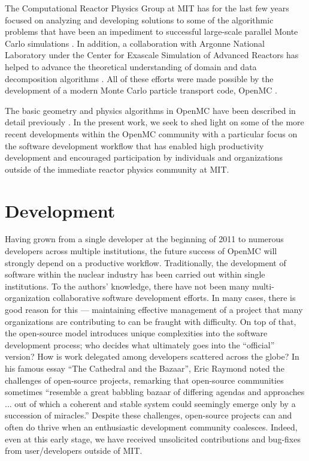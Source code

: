 \documentclass{ansconf}
\begin{document}
The Computational Reactor Physics Group at MIT has for the last few years
focused on analyzing and developing solutions to some of the algorithmic
problems that have been an impediment to successful large-scale parallel Monte
Carlo simulations \cite{pnst-romano-2011, nse-romano-2012,
  trans-romano-2012}. In addition, a collaboration with Argonne National
Laboratory under the Center for Exascale Simulation of Advanced Reactors has
helped to advance the theoretical understanding of domain and data decomposition
algorithms \cite{jcp-siegel-2012-1, jcp-siegel-2012-2}. All of these efforts
were made possible by the development of a modern Monte Carlo particle transport
code, OpenMC \cite{openmc-github-2012}.

The basic geometry and physics algorithms in OpenMC have been described in
detail previously \cite{ane-romano-2013}. In the present work, we seek to shed
light on some of the more recent developments within the OpenMC community with a
particular focus on the software development workflow that has enabled high
productivity development and encouraged participation by individuals and
organizations outside of the immediate reactor physics community at MIT.

\section{Development}

Having grown from a single developer at the beginning of 2011 to numerous
developers across multiple institutions, the future success of OpenMC will
strongly depend on a productive workflow. Traditionally, the development of
software within the nuclear industry has been carried out within single
institutions. To the authors' knowledge, there have not been many
multi-organization collaborative software development efforts. In many cases,
there is good reason for this --- maintaining effective management of a project
that many organizations are contributing to can be fraught with difficulty. On
top of that, the open-source model introduces unique complexities into the
software development process; who decides what ultimately goes into the
``official'' version? How is work delegated among developers scattered across
the globe?  In his famous essay ``The Cathedral and the Bazaar'', Eric Raymond
noted the challenges of open-source projects, remarking that \cite{raymond-1999}
open-source communities sometimes ``resemble a great babbling bazaar of
differing agendas and approaches ... out of which a coherent and stable system
could seemingly emerge only by a succession of miracles.'' Despite these
challenges, open-source projects can and often do thrive when an enthusiastic
development community coalesces. Indeed, even at this early stage, we have
received unsolicited contributions and bug-fixes from user/developers outside of
MIT.
\end{document}
